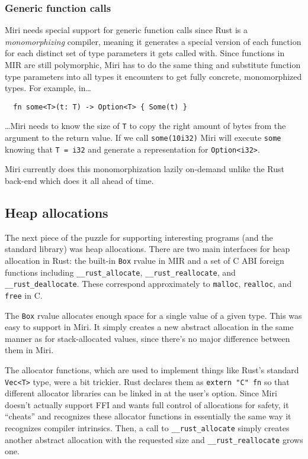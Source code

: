 \documentclass[twocolumn]{article}
\newcommand{\rust}[1]{\texttt{#1}}
\begin{document}
\subsubsection{Generic function calls}

Miri needs special support for generic function calls since Rust is a \emph{monomorphizing}
compiler, meaning it generates a special version of each function for each distinct set of type
parameters it gets called with. Since functions in MIR are still polymorphic, Miri has to do the
same thing and substitute function type parameters into all types it encounters to get fully
concrete, monomorphized types. For example, in\ldots

\begin{verbatim}
  fn some<T>(t: T) -> Option<T> { Some(t) }
\end{verbatim}

\ldots{}Miri needs to know the size of \rust{T} to copy the right amount of bytes from the argument
to the return value. If we call \rust{some(10i32)} Miri will execute \rust{some} knowing that
\rust{T = i32} and generate a representation for \rust{Option<i32>}.

Miri currently does this monomorphization lazily on-demand unlike the Rust back-end which does it
all ahead of time.

\subsection{Heap allocations}

The next piece of the puzzle for supporting interesting programs (and the standard library) was heap
allocations. There are two main interfaces for heap allocation in Rust: the built-in \rust{Box}
rvalue in MIR and a set of C ABI foreign functions including \rust{__rust_allocate},
\rust{__rust_reallocate}, and \rust{__rust_deallocate}. These correspond approximately to
\texttt{malloc}, \texttt{realloc}, and \texttt{free} in C.

The \rust{Box} rvalue allocates enough space for a single value of a given type. This was easy to
support in Miri. It simply creates a new abstract allocation in the same manner as for
stack-allocated values, since there's no major difference between them in Miri.

The allocator functions, which are used to implement things like Rust's standard \rust{Vec<T>} type,
were a bit trickier. Rust declares them as \rust{extern "C" fn} so that different allocator
libraries can be linked in at the user's option. Since Miri doesn't actually support FFI and wants
full control of allocations for safety, it ``cheats'' and recognizes these allocator functions in
essentially the same way it recognizes compiler intrinsics. Then, a call to \rust{__rust_allocate}
simply creates another abstract allocation with the requested size and \rust{__rust_reallocate}
grows one.
\end{document}
